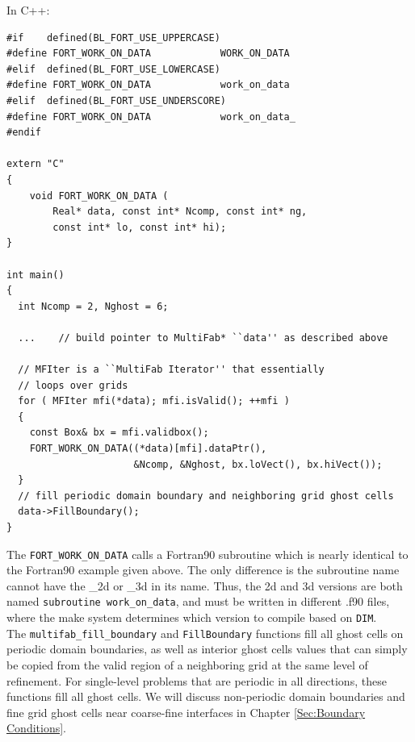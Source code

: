 In C++:
\begin{lstlisting}[backgroundcolor=\color{light-blue}]
#if    defined(BL_FORT_USE_UPPERCASE)
#define FORT_WORK_ON_DATA            WORK_ON_DATA
#elif  defined(BL_FORT_USE_LOWERCASE)
#define FORT_WORK_ON_DATA            work_on_data
#elif  defined(BL_FORT_USE_UNDERSCORE)
#define FORT_WORK_ON_DATA            work_on_data_
#endif

extern "C"
{
    void FORT_WORK_ON_DATA (
        Real* data, const int* Ncomp, const int* ng,
        const int* lo, const int* hi);
}

int main()
{
  int Ncomp = 2, Nghost = 6;

  ...    // build pointer to MultiFab* ``data'' as described above
  
  // MFIter is a ``MultiFab Iterator'' that essentially
  // loops over grids
  for ( MFIter mfi(*data); mfi.isValid(); ++mfi )
  {
    const Box& bx = mfi.validbox();
    FORT_WORK_ON_DATA((*data)[mfi].dataPtr(),
                      &Ncomp, &Nghost, bx.loVect(), bx.hiVect());
  }
  // fill periodic domain boundary and neighboring grid ghost cells
  data->FillBoundary();
}
\end{lstlisting}
The {\tt FORT\_WORK\_ON\_DATA} calls a Fortran90 subroutine which is nearly
identical to the Fortran90 example given above.  The only difference is the subroutine
name cannot have the \_2d or \_3d in its name.  Thus, the 2d and 3d versions
are both named {\tt subroutine work\_on\_data}, and must be written in
different .f90 files, where the make system determines which version to compile
based on {\tt DIM}.\\

The {\tt multifab\_fill\_boundary} and {\tt FillBoundary} functions 
fill all ghost cells on periodic domain boundaries, as well as interior
ghost cells values that can simply be copied from the valid region of a neighboring
grid at the same level of refinement.  For single-level problems that are periodic
in all directions, these functions fill all ghost cells.  We will discuss
non-periodic domain boundaries and fine grid ghost cells near coarse-fine interfaces
in Chapter \ref{Sec:Boundary Conditions}.

